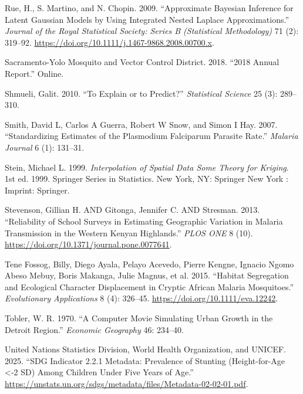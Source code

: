 \documentclass[
  letterpaper,
]{krantz}
\newlength{\cslhangindent}
\newenvironment{CSLReferences}[2] %
 {\begin{list}{}{%
  \setlength{\itemindent}{0pt}
  \setlength{\leftmargin}{0pt}
  \setlength{\parsep}{0pt}
  \ifodd #1
   \setlength{\leftmargin}{\cslhangindent}
   \setlength{\itemindent}{-1\cslhangindent}
  \fi
  \setlength{\itemsep}{#2\baselineskip}}}
 {\end{list}}
\begin{document}
\begin{CSLReferences}{1}{0}
Rue, H., S. Martino, and N. Chopin. 2009. {``Approximate Bayesian
Inference for Latent Gaussian Models by Using Integrated Nested Laplace
Approximations.''} \emph{Journal of the Royal Statistical Society:
Series B (Statistical Methodology)} 71 (2): 319--92.
\url{https://doi.org/10.1111/j.1467-9868.2008.00700.x}.

Sacramento-Yolo Mosquito and Vector Control District. 2018. {``2018
Annual Report.''} Online.

Shmueli, Galit. 2010. {``To Explain or to Predict?''} \emph{Statistical
Science} 25 (3): 289--310.

Smith, David L, Carlos A Guerra, Robert W Snow, and Simon I Hay. 2007.
{``Standardizing Estimates of the Plasmodium Falciparum Parasite
Rate.''} \emph{Malaria Journal} 6 (1): 131--31.

Stein, Michael L. 1999. \emph{Interpolation of Spatial Data Some Theory
for Kriging}. 1st ed. 1999. Springer Series in Statistics. New York, NY:
Springer New York : Imprint: Springer.

Stevenson, Gillian H. AND Gitonga, Jennifer C. AND Stresman. 2013.
{``Reliability of School Surveys in Estimating Geographic Variation in
Malaria Transmission in the Western Kenyan Highlands.''} \emph{PLOS ONE}
8 (10). \url{https://doi.org/10.1371/journal.pone.0077641}.

Tene Fossog, Billy, Diego Ayala, Pelayo Acevedo, Pierre Kengne, Ignacio
Ngomo Abeso Mebuy, Boris Makanga, Julie Magnus, et al. 2015. {``Habitat
Segregation and Ecological Character Displacement in Cryptic African
Malaria Mosquitoes.''} \emph{Evolutionary Applications} 8 (4): 326--45.
\url{https://doi.org/10.1111/eva.12242}.

Tobler, W. R. 1970. {``A Computer Movie Simulating Urban Growth in the
Detroit Region.''} \emph{Economic Geography} 46: 234--40.

United Nations Statistics Division, World Health Organization, and
UNICEF. 2025. {``SDG Indicator 2.2.1 Metadata: Prevalence of Stunting
(Height-for-Age \textless-2 SD) Among Children Under Five Years of
Age.''}
\url{https://unstats.un.org/sdgs/metadata/files/Metadata-02-02-01.pdf}.


\end{CSLReferences}
\end{document}
